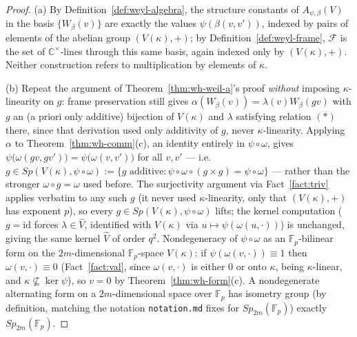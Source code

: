 
\begin{proof}
(a) By Definition~\ref{def:weyl-algebra}, the structure constants of
$A_{\psi,\beta}(V)$ in the basis $\{W_\beta(v)\}$ are exactly the values
$\psi(\beta(v,v'))$, indexed by pairs of elements of the abelian group
$(V(\kappa),+)$; by Definition~\ref{def:weyl-frame}, $\mathcal{F}$ is the
set of $\mathbb{C}^\times$-lines through this same basis, again indexed only
by $(V(\kappa),+)$. Neither construction refers to multiplication by
elements of $\kappa$.

(b) Repeat the argument of Theorem~\ref{thm:wh-weil-a}'s proof
\emph{without} imposing $\kappa$-linearity on $g$: frame preservation still
gives $\alpha(W_\beta(v))=\lambda(v)W_\beta(gv)$ with $g$ an (a priori only
additive) bijection of $V(\kappa)$ and $\lambda$ satisfying relation $(*)$
there, since that derivation used only additivity of $g$, never
$\kappa$-linearity. Applying $\alpha$ to Theorem~\ref{thm:wh-comm}(c), an
identity entirely in $\psi\circ\omega$, gives
$\psi\big(\omega(gv,gv')\big)=\psi\big(\omega(v,v')\big)$ for all $v,v'$ —
i.e.\ $g\in Sp(V(\kappa),\psi\circ\omega):=\{g \text{ additive} : \psi\circ\omega\circ(g\times g)=\psi\circ\omega\}$
— rather than the stronger $\omega\circ g=\omega$ used before. The
surjectivity argument via Fact~\ref{fact:triv} applies verbatim to any such
$g$ (it never used $\kappa$-linearity, only that $(V(\kappa),+)$ has
exponent $p$), so every $g\in Sp(V(\kappa),\psi\circ\omega)$ lifts; the
kernel computation ($g=\mathrm{id}$ forces $\lambda\in\hat V$, identified
with $V(\kappa)$ via $u\mapsto\psi(\omega(u,\cdot))$) is unchanged, giving
the same kernel $\hat V$ of order $q^2$. Nondegeneracy of $\psi\circ\omega$
as an $\mathbb{F}_p$-bilinear form on the $2m$-dimensional $\mathbb{F}_p$-space
$V(\kappa)$: if $\psi(\omega(v,\cdot))\equiv 1$ then $\omega(v,\cdot)\equiv0$
(Fact~\ref{fact:val}, since $\omega(v,\cdot)$ is either $0$ or onto $\kappa$,
being $\kappa$-linear, and $\kappa\not\subseteq\ker\psi$), so $v=0$ by
Theorem~\ref{thm:wh-form}(c). A nondegenerate alternating form on a
$2m$-dimensional space over $\mathbb{F}_p$ has isometry group (by
definition, matching the notation \texttt{notation.md} fixes for
$Sp_{2m}(\mathbb{F}_p)$) exactly $Sp_{2m}(\mathbb{F}_p)$.


\end{proof}
